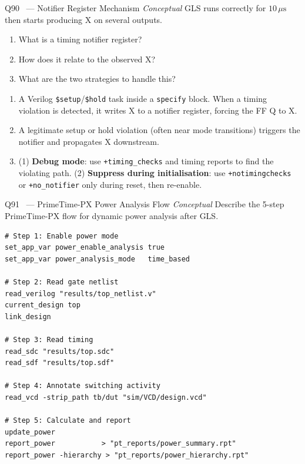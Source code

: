 \documentclass[12pt,a4paper]{article}
\newcommand{\advanced}{%
  \fbox{\textcolor{advred}{\bfseries\sffamily\small ADVANCED}}}
\newcommand{\moderate}{%
  \fbox{\textcolor{modoran}{\bfseries\sffamily\small MODERATE}}}
\begin{document}
\begin{questionbox}{Q90 \advanced\ --- Notifier Register Mechanism \hfill\textit{Conceptual}}
GLS runs correctly for $10\,\mu\text{s}$ then starts producing X on several outputs.
\begin{enumerate}[label=\textbf{\alph*)}]
  \item What is a timing notifier register?
  \item How does it relate to the observed X?
  \item What are the two strategies to handle this?
\end{enumerate}
\end{questionbox}

\begin{answerbox}
\begin{enumerate}[label=\textbf{\alph*)}]
  \item A Verilog \texttt{\$setup}/\texttt{\$hold} task inside a \texttt{specify} block. When a timing violation is detected, it writes X to a notifier register, forcing the FF Q to X.
  \item A legitimate setup or hold violation (often near mode transitions) triggers the notifier and propagates X downstream.
  \item (1) \textbf{Debug mode}: use \texttt{+timing\_checks} and timing reports to find the violating path. (2) \textbf{Suppress during initialisation}: use \texttt{+notimingchecks} or \texttt{+no\_notifier} only during reset, then re-enable.
\end{enumerate}
\end{answerbox}

\begin{questionbox}{Q91 \moderate\ --- PrimeTime-PX Power Analysis Flow \hfill\textit{Conceptual}}
Describe the 5-step PrimeTime-PX flow for dynamic power analysis after GLS.
\end{questionbox}

\begin{answerbox}
\begin{lstlisting}[style=tclstyle]
# Step 1: Enable power mode
set_app_var power_enable_analysis true
set_app_var power_analysis_mode   time_based

# Step 2: Read gate netlist
read_verilog "results/top_netlist.v"
current_design top
link_design

# Step 3: Read timing
read_sdc "results/top.sdc"
read_sdf "results/top.sdf"

# Step 4: Annotate switching activity
read_vcd -strip_path tb/dut "sim/VCD/design.vcd"

# Step 5: Calculate and report
update_power
report_power           > "pt_reports/power_summary.rpt"
report_power -hierarchy > "pt_reports/power_hierarchy.rpt"
\end{lstlisting}
\end{answerbox}
\end{document}
